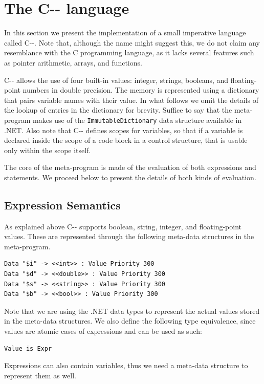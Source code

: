 \section{The C-{}- language}
In this section we present the implementation of a small imperative language called C-{}-. Note that, although the name might suggest this, we do not claim any resemblance with the C programming language, as it lacks several features such as pointer arithmetic, arrays, and functions.

C-{}- allows the use of four built-in values: integer, strings, booleans, and floating-point numbers in double precision. The memory is represented using a dictionary that pairs variable names with their value. In what follows we omit the details of the lookup of entries in the dictionary for brevity. Suffice to say that the meta-program makes use of the \texttt{ImmutableDictionary} data structure available in .NET. Also note that C-{}- defines scopes for variables, so that if a variable is declared inside the scope of a code block in a control structure, that is usable only within the scope itself.

The core of the meta-program is made of the evaluation of both expressions and statements. We proceed below to present the details of both kinds of evaluation.

\subsection{Expression Semantics}
As explained above C-{}- supports boolean, string, integer, and floating-point values. These are represented through the following meta-data structures in the meta-program.

\begin{lstlisting}
Data "$i" -> <<int>> : Value Priority 300
Data "$d" -> <<double>> : Value Priority 300
Data "$s" -> <<string>> : Value Priority 300
Data "$b" -> <<bool>> : Value Priority 300
\end{lstlisting}

\noindent
Note that we are using the .NET data types to represent the actual values stored in the meta-data structures. We also define the following type equivalence, since values are atomic cases of expressions and can be used as such:

\begin{lstlisting}
Value is Expr
\end{lstlisting}

\noindent
Expressions can also contain variables, thus we need a meta-data structure to represent them as well.

